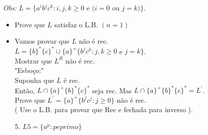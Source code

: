\documentclass{article}
\begin{document}
    \textit{Obs:} $ L = \{ a^ib^jc^k : i, j, k \geq 0$ e $( i = 0$ ou $ j = k ) \} $.
    \begin{itemize}
        \item Prove que $ L $ satisfaz o L.B. $ ( n = 1 ) $
        \item Vamos provar que $ L $ não é rec.\\
        $ L = \{b\}^*\{c\}^* \cup \{a\}^+\{b^jc^k : j,k \geq 0 $ e $ j=k \} $.\\
        Mostrar que $ L^R$ não é rec.\\
        "Esboço:"\\
        Suponha que $L$ é rec.\\
        Então, $ L \cap \{a\}^+\{b\}^*\{c\}^* $ seja rec. Mas $ L \cap \{a\}^+\{b\}^*\{c\}^* = L^{'} $.\\
        Prove que $ L^{'} = \{a\}^+\{b^jc^j : j \geq 0\} $ não é rec.\\
        ( Use o L.B. para provar que Rec e fechada para inverso ).
    \end{itemize}
    \begin{enumerate}
        \item[5.] $ L5 = \{a^p : p e primo \} $
    \end{enumerate}
 
\end{document}
